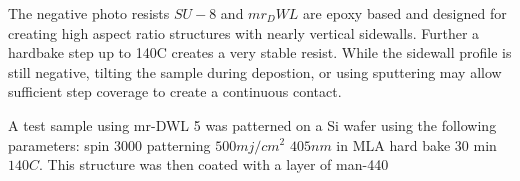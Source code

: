 The negative photo resists $SU-8$ and $mr_DWL$ are epoxy based and designed for creating high aspect ratio structures with nearly vertical sidewalls. Further a hardbake step up to 140C creates a very stable resist. While the sidewall profile is still negative, tilting the sample during depostion, or using sputtering may allow sufficient step coverage to create a continuous contact. 



A test sample using mr-DWL 5 was patterned on a Si wafer using the following parameters: spin 3000 patterning $500 mj/cm^2$ $405nm$ in MLA hard bake 30 min $140C$. This structure was then coated with a layer of man-440 





\cleardoublepage